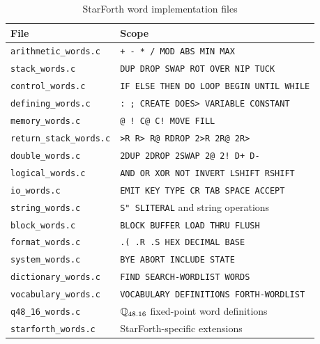 \begin{table}[ht]
  \centering
  \caption{StarForth word implementation files}
  \label{tab:words}
  \begin{tabular}{ll}
    \toprule
    File & Scope \\
    \midrule
    \texttt{arithmetic\_words.c}       & \texttt{+ - * / MOD ABS MIN MAX} \\
    \texttt{stack\_words.c}            & \texttt{DUP DROP SWAP ROT OVER NIP TUCK} \\
    \texttt{control\_words.c}          & \texttt{IF ELSE THEN DO LOOP BEGIN UNTIL WHILE} \\
    \texttt{defining\_words.c}         & \texttt{: ; CREATE DOES> VARIABLE CONSTANT} \\
    \texttt{memory\_words.c}           & \texttt{@ ! C@ C! MOVE FILL} \\
    \texttt{return\_stack\_words.c}    & \texttt{>R R> R@ RDROP 2>R 2R@ 2R>} \\
    \texttt{double\_words.c}           & \texttt{2DUP 2DROP 2SWAP 2@ 2! D+ D-} \\
    \texttt{logical\_words.c}          & \texttt{AND OR XOR NOT INVERT LSHIFT RSHIFT} \\
    \texttt{io\_words.c}               & \texttt{EMIT KEY TYPE CR TAB SPACE ACCEPT} \\
    \texttt{string\_words.c}           & \texttt{S" SLITERAL} and string operations \\
    \texttt{block\_words.c}            & \texttt{BLOCK BUFFER LOAD THRU FLUSH} \\
    \texttt{format\_words.c}           & \texttt{.( .R .S HEX DECIMAL BASE} \\
    \texttt{system\_words.c}           & \texttt{BYE ABORT INCLUDE STATE} \\
    \texttt{dictionary\_words.c}       & \texttt{FIND SEARCH-WORDLIST WORDS} \\
    \texttt{vocabulary\_words.c}       & \texttt{VOCABULARY DEFINITIONS FORTH-WORDLIST} \\
    \texttt{q48\_16\_words.c}          & $\mathbb{Q}_{48.16}$ fixed-point word definitions \\
    \texttt{starforth\_words.c}        & StarForth-specific extensions \\
    \bottomrule
  \end{tabular}
\end{table}

